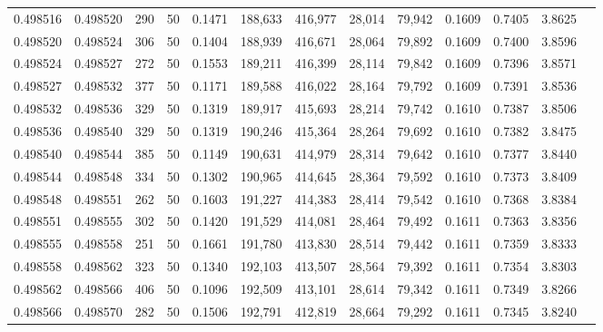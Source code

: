 \begin{tabular}{rrrrrrrrrrrrr}
0.498516 & 0.498520 & 290 &  50 &                                     0.1471 & 188,633 & 416,977 &  28,014 &  79,942 & 0.1609 & 0.7405 & 3.8625 \\
0.498520 & 0.498524 & 306 &  50 &                                     0.1404 & 188,939 & 416,671 &  28,064 &  79,892 & 0.1609 & 0.7400 & 3.8596 \\
0.498524 & 0.498527 & 272 &  50 &                                     0.1553 & 189,211 & 416,399 &  28,114 &  79,842 & 0.1609 & 0.7396 & 3.8571 \\
0.498527 & 0.498532 & 377 &  50 &                                     0.1171 & 189,588 & 416,022 &  28,164 &  79,792 & 0.1609 & 0.7391 & 3.8536 \\
0.498532 & 0.498536 & 329 &  50 &                                     0.1319 & 189,917 & 415,693 &  28,214 &  79,742 & 0.1610 & 0.7387 & 3.8506 \\
0.498536 & 0.498540 & 329 &  50 &                                     0.1319 & 190,246 & 415,364 &  28,264 &  79,692 & 0.1610 & 0.7382 & 3.8475 \\
0.498540 & 0.498544 & 385 &  50 &                                     0.1149 & 190,631 & 414,979 &  28,314 &  79,642 & 0.1610 & 0.7377 & 3.8440 \\
0.498544 & 0.498548 & 334 &  50 &                                     0.1302 & 190,965 & 414,645 &  28,364 &  79,592 & 0.1610 & 0.7373 & 3.8409 \\
0.498548 & 0.498551 & 262 &  50 &                                     0.1603 & 191,227 & 414,383 &  28,414 &  79,542 & 0.1610 & 0.7368 & 3.8384 \\
0.498551 & 0.498555 & 302 &  50 &                                     0.1420 & 191,529 & 414,081 &  28,464 &  79,492 & 0.1611 & 0.7363 & 3.8356 \\
0.498555 & 0.498558 & 251 &  50 &                                     0.1661 & 191,780 & 413,830 &  28,514 &  79,442 & 0.1611 & 0.7359 & 3.8333 \\
0.498558 & 0.498562 & 323 &  50 &                                     0.1340 & 192,103 & 413,507 &  28,564 &  79,392 & 0.1611 & 0.7354 & 3.8303 \\
0.498562 & 0.498566 & 406 &  50 &                                     0.1096 & 192,509 & 413,101 &  28,614 &  79,342 & 0.1611 & 0.7349 & 3.8266 \\
0.498566 & 0.498570 & 282 &  50 &                                     0.1506 & 192,791 & 412,819 &  28,664 &  79,292 & 0.1611 & 0.7345 & 3.8240 \\

\end{tabular}
